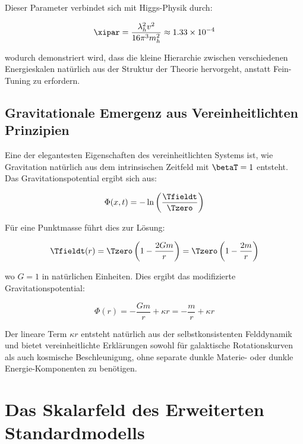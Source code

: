	Dieser Parameter verbindet sich mit Higgs-Physik durch:
	
	\begin{equation}
		\xipar = \frac{\lambda_h^2 v^2}{16\pi^3 m_h^2} \approx 1.33 \times 10^{-4}
	\end{equation}
	
	wodurch demonstriert wird, dass die kleine Hierarchie zwischen verschiedenen Energieskalen natürlich aus der Struktur der Theorie hervorgeht, anstatt Fein-Tuning zu erfordern.
	
	\subsection{Gravitationale Emergenz aus Vereinheitlichten Prinzipien}
	\label{subsec:gravitational_emergence_unified}
	
	Eine der elegantesten Eigenschaften des vereinheitlichten Systems ist, wie Gravitation natürlich aus dem intrinsischen Zeitfeld mit $\betaT = 1$ entsteht. Das Gravitationspotential ergibt sich aus:
	
	\begin{equation}
		\Phi(x,t) = -\ln\left(\frac{\Tfieldt}{\Tzero}\right)
	\end{equation}
	
	Für eine Punktmasse führt dies zur Lösung:
	
	\begin{equation}
		\Tfieldt(r) = \Tzero\left(1 - \frac{2Gm}{r}\right) = \Tzero\left(1 - \frac{2m}{r}\right)
	\end{equation}
	
	wo $G = 1$ in natürlichen Einheiten. Dies ergibt das modifizierte Gravitationspotential:
	
	\begin{equation}
		\Phi(r) = -\frac{Gm}{r} + \kappa r = -\frac{m}{r} + \kappa r
	\end{equation}
	
	Der lineare Term $\kappa r$ entsteht natürlich aus der selbstkonsistenten Felddynamik und bietet vereinheitlichte Erklärungen sowohl für galaktische Rotationskurven als auch kosmische Beschleunigung, ohne separate dunkle Materie- oder dunkle Energie-Komponenten zu benötigen.
	
	\section{Das Skalarfeld des Erweiterten Standardmodells}
	\label{sec:esm_scalar_field}
	
